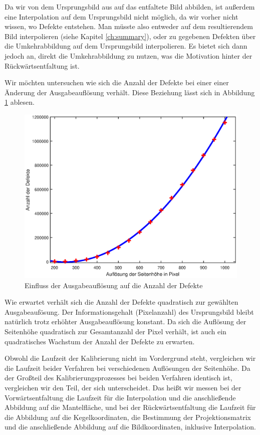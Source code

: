 Da wir von dem Ursprungsbild aus auf das entfaltete Bild abbilden, ist außerdem eine Interpolation auf dem Ursprungsbild nicht möglich, da wir vorher nicht wissen, wo Defekte entstehen. Man müsste also entweder auf dem resultierendem Bild interpolieren (siehe Kapitel \ref{ch:summary}), oder zu gegebenen Defekten über die Umkehrabbildung auf dem Ursprungsbild interpolieren. 
Es bietet sich dann jedoch an, direkt die Umkehrabbildung zu nutzen, was die Motivation hinter der Rückwärtsentfaltung ist.

Wir möchten untersuchen wie sich die Anzahl der Defekte bei einer einer Änderung der Ausgabeauflösung verhält. Diese Beziehung lässt sich in Abbildung \ref{fig:influenceRes} ablesen. 
\begin{figure}[!htb]
	\centering
	\includegraphics[width=\textwidth]{images/numberOfHoles.eps}
	\caption{Einfluss der Ausgabeauflösung auf die Anzahl der Defekte}
	\label{fig:influenceRes}
\end{figure}

Wie erwartet verhält sich die Anzahl der Defekte quadratisch zur gewählten Ausgabeaufösung. Der Informationsgehalt (Pixelanzahl) des Ursprungsbild bleibt natürlich trotz erhöhter Ausgabeauflösung konstant. Da sich die Auflösung der Seitenhöhe quadratisch zur Gesamtanzahl der Pixel verhält, ist auch ein quadratisches Wachstum der Anzahl der Defekte zu erwarten. 

Obwohl die Laufzeit der Kalibrierung nicht im Vordergrund steht, vergleichen wir die Laufzeit beider Verfahren bei verschiedenen Auflösungen der Seitenhöhe. Da der Großteil des Kalibrierungsprozesses bei beiden Verfahren identisch ist, vergleichen wir den Teil, der sich unterscheidet. Das heißt wir messen bei der Vorwärtsentfaltung die Laufzeit für die Interpolation und die anschließende Abbildung auf die Mantelfläche, und bei der Rückwärtsentfaltung die Laufzeit für die Abbildung auf die Kegelkoordinaten, die Bestimmung der Projektionsmatrix und die anschließende Abbildung auf die Bildkoordinaten, inklusive Interpolation.


